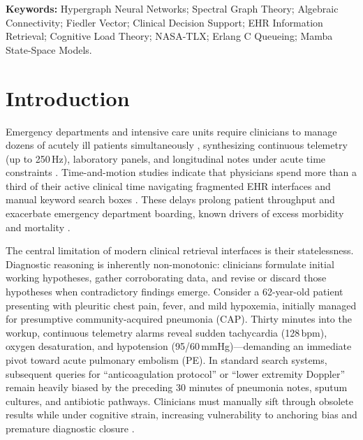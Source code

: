 \documentclass[10pt, onecolumn]{article}
\begin{document}
\noindent\textbf{Keywords:}
Hypergraph Neural Networks; Spectral Graph Theory; Algebraic Connectivity; Fiedler Vector; Clinical Decision Support; EHR Information Retrieval; Cognitive Load Theory; NASA-TLX; Erlang C Queueing; Mamba State-Space Models.

\section{Introduction}
\label{sec:introduction}

Emergency departments and intensive care units require clinicians to manage dozens of acutely ill patients simultaneously \cite{topol2019high,miotto2018deep}, synthesizing continuous telemetry (up to 250\,Hz), laboratory panels, and longitudinal notes under acute time constraints \cite{johnson2023mimic,hyland2020hirid}. Time-and-motion studies indicate that physicians spend more than a third of their active clinical time navigating fragmented EHR interfaces and manual keyword search boxes \cite{sinsky2016allocation,zheng2021analyzing}. These delays prolong patient throughput and exacerbate emergency department boarding, known drivers of excess morbidity and mortality \cite{singer2011crowding,pines2011emergency,singh2014types}.

The central limitation of modern clinical retrieval interfaces is their statelessness. Diagnostic reasoning is inherently non-monotonic: clinicians formulate initial working hypotheses, gather corroborating data, and revise or discard those hypotheses when contradictory findings emerge. Consider a 62-year-old patient presenting with pleuritic chest pain, fever, and mild hypoxemia, initially managed for presumptive community-acquired pneumonia (CAP). Thirty minutes into the workup, continuous telemetry alarms reveal sudden tachycardia (128\,bpm), oxygen desaturation, and hypotension (95/60\,mmHg)—demanding an immediate pivot toward acute pulmonary embolism (PE). In standard search systems, subsequent queries for ``anticoagulation protocol'' or ``lower extremity Doppler'' remain heavily biased by the preceding 30 minutes of pneumonia notes, sputum cultures, and antibiotic pathways. Clinicians must manually sift through obsolete results while under cognitive strain, increasing vulnerability to anchoring bias and premature diagnostic closure \cite{croskerry2002achieving,goddard2012automation}.
\end{document}
